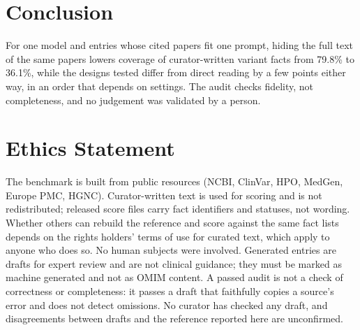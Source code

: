 \documentclass{article} %
\begin{document}
\section{Conclusion}
\label{sec:conclusion}
For one model and entries whose cited papers fit one prompt, hiding the full text of the same papers lowers coverage of curator-written variant facts from 79.8\% to 36.1\%, while the designs tested differ from direct reading by a few points either way, in an order that depends on settings. The audit checks fidelity, not completeness, and no judgement was validated by a person.

\section*{Ethics Statement}
The benchmark is built from public resources (NCBI, ClinVar, HPO, MedGen, Europe PMC, HGNC). Curator-written text is used for scoring and is not redistributed; released score files carry fact identifiers and statuses, not wording. Whether others can rebuild the reference and score against the same fact lists depends on the rights holders' terms of use for curated text, which apply to anyone who does so. No human subjects were involved. Generated entries are drafts for expert review and are not clinical guidance; they must be marked as machine generated and not as OMIM content. A passed audit is not a check of correctness or completeness: it passes a draft that faithfully copies a source's error and does not detect omissions. No curator has checked any draft, and disagreements between drafts and the reference reported here are unconfirmed.
\end{document}
